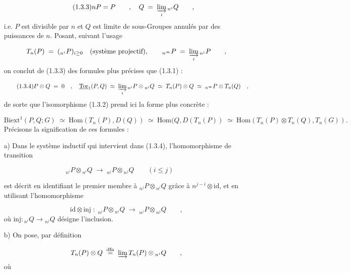 \begin{equation}\tag{1.3.3}
nP=P \qquad , \quad Q \;=\; \varinjlim_i {}_{n^i}Q \qquad ,
\end{equation}
i.e. $P$ est divisible par $n$ et $Q$ est limite de sous-Groupes annulés par des puissances de $n$. Posant, suivant l'usage

\begin{equation*}
T_n(P) \;=\; ({}_{n^i}P)_{i \geq 0} \quad (\text{système projectif}), \qquad {}_{n^\infty}P \;=\; \varinjlim_i {}_{n^i}P \qquad ,
\end{equation*}
on conclut de (1.3.3) des formules plus précises que (1.3.1) :

\begin{equation}\tag{1.3.4}
P \otimes Q \;=\; 0 \quad , \quad \underline{\mathrm{Tor}}_1(P,Q) \;\simeq\; \varinjlim_i {}_{n^i}P \otimes {}_{n^i}Q \;\simeq\; T_n(P) \otimes Q \;\simeq\; {}_{n^\infty}P \otimes T_n(Q) \quad ,
\end{equation}
de sorte que l'isomorphisme (1.3.2) prend ici la forme plus concrète :

\begin{equation}\tag{1.3.5}
\mathrm{Biext}^1(P,Q;G) \;\simeq\; \mathrm{Hom}(T_n(P),D(Q)) \;\simeq\; \mathrm{Hom}(Q,D(T_n(P)) \;\simeq\; \mathrm{Hom}(T_n(P) \otimes T_n(Q),T_n(G)).
\end{equation}
Précisons la signification de ces formules :

a)  Dans le système inductif qui intervient dans (1.3.4), l'homomorphisme de transition

\begin{equation*}
{}_{n^i}P \otimes {}_{n^i}Q \;\longrightarrow\; {}_{n^j}P \otimes {}_{n^j}Q \qquad (i \leq j) \qquad 
\end{equation*}


 est décrit en identifiant le premier membre à ${}_{n^j}P \otimes {}_{n^i}Q$ grâce à $n^{j-i} \otimes \mathrm{id}$, et en utilisant l'homomorphisme

\begin{equation*}
\mathrm{id} \otimes \mathrm{inj} \;:\; {}_{n^j}P \otimes {}_{n^i}Q \;\longrightarrow\; {}_{n^j}P \otimes {}_{n^j}Q \qquad ,
\end{equation*}
où $\mathrm{inj} : {}_{n^i}Q \longrightarrow {}_{n^j}Q$ désigne l'inclusion.

b)  On pose, par définition

\begin{equation*}
T_n(P) \otimes Q \;\overset{\mathrm{dfn}}{=}\; \varinjlim T_n(P) \otimes {}_{n^i}Q \qquad ,
\end{equation*}
où

